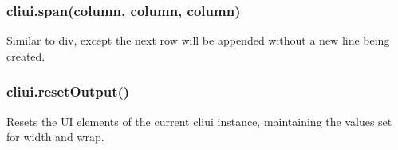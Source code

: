 \subsubsection*{cliui.\+span(column, column, column)}

Similar to {\ttfamily div}, except the next row will be appended without a new line being created.

\subsubsection*{cliui.\+reset\+Output()}

Resets the UI elements of the current cliui instance, maintaining the values set for {\ttfamily width} and {\ttfamily wrap}. 